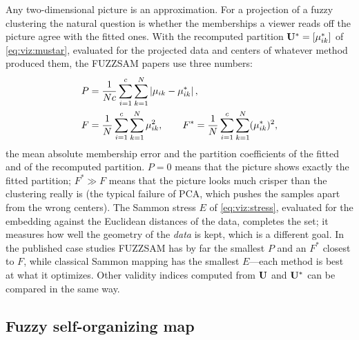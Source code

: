 Any two-dimensional picture is an approximation. For a projection of a fuzzy clustering the natural question is whether the memberships a viewer reads off the picture agree with the fitted ones. With the recomputed partition $\mathbf{U}^*=[\mu^*_{ik}]$ of \eqref{eq:viz:mustar}, evaluated for the projected data and centers of whatever method produced them, the FUZZSAM papers use three numbers:
\begin{align}
  P &= \frac{1}{Nc}\sum_{i=1}^{c}\sum_{k=1}^{N}\left\lvert \mu_{ik}-\mu^*_{ik} \right\rvert, \label{eq:viz:P}\\
  F &= \frac{1}{N}\sum_{i=1}^{c}\sum_{k=1}^{N}\mu_{ik}^2,\qquad F^* = \frac{1}{N}\sum_{i=1}^{c}\sum_{k=1}^{N}(\mu^*_{ik})^2, \label{eq:viz:F}
\end{align}
the mean absolute membership error and the partition coefficients \cite{bezdek:1981} of the fitted and of the recomputed partition. $P=0$ means that the picture shows exactly the fitted partition; $F^*\gg F$ means that the picture looks much crisper than the clustering really is (the typical failure of PCA, which pushes the samples apart from the wrong centers). The Sammon stress $E$ of \eqref{eq:viz:stress}, evaluated for the embedding against the Euclidean distances of the data, completes the set; it measures how well the geometry of the \emph{data} is kept, which is a different goal. In the published case studies FUZZSAM has by far the smallest $P$ and an $F^*$ closest to $F$, while classical Sammon mapping has the smallest $E$---each method is best at what it optimizes. Other validity indices computed from $\mathbf{U}$ and $\mathbf{U}^*$ can be compared in the same way.

\subsection{Fuzzy self-organizing map}\label{sec:viz:fsom}

